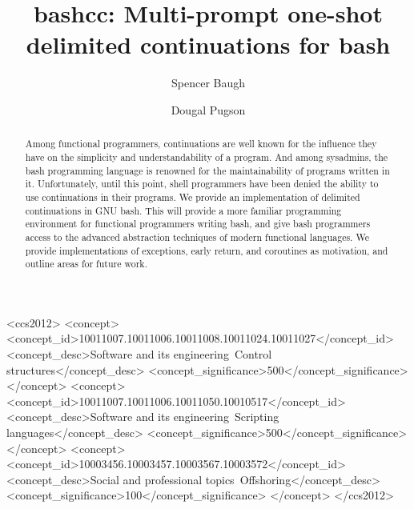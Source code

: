 \documentclass[sigplan]{acmart}
\begin{document}
\title[bashcc: Delimited continuations for bash]{bashcc: Multi-prompt one-shot delimited continuations for bash}

\author{Spencer Baugh}
\author{Dougal Pugson}

\begin{abstract}
Among functional programmers,
continuations are well known for the influence they have on the simplicity and understandability of a program.
And among sysadmins,
the bash programming language is renowned for the maintainability of programs written in it.
Unfortunately, until this point, shell programmers have been denied the ability to use continuations in their programs.
We provide an implementation of delimited continuations in GNU bash.
This will provide a more familiar programming environment for functional programmers writing bash,
and give bash programmers access to the advanced abstraction techniques of modern functional languages.
We provide implementations of exceptions, early return, and coroutines as motivation,
and outline areas for future work.
\end{abstract}

%
%
\begin{CCSXML}
  <ccs2012>
  <concept>
  <concept_id>10011007.10011006.10011008.10011024.10011027</concept_id>
  <concept_desc>Software and its engineering~Control structures</concept_desc>
  <concept_significance>500</concept_significance>
  </concept>
  <concept>
  <concept_id>10011007.10011006.10011050.10010517</concept_id>
  <concept_desc>Software and its engineering~Scripting languages</concept_desc>
  <concept_significance>500</concept_significance>
  </concept>
  <concept>
  <concept_id>10003456.10003457.10003567.10003572</concept_id>
  <concept_desc>Social and professional topics~Offshoring</concept_desc>
  <concept_significance>100</concept_significance>
  </concept>
  </ccs2012>
\end{CCSXML}

\end{document}
